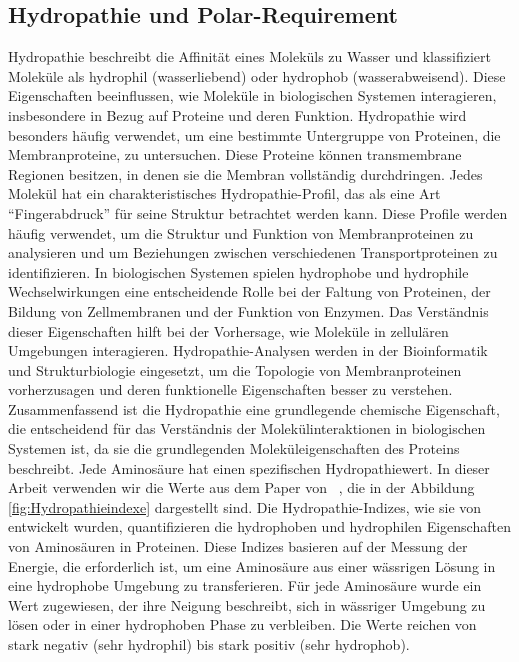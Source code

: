 \documentclass[german,version-2022-01]{uzl-thesis}
\begin{document}
\subsection{Hydropathie und Polar-Requirement}
Hydropathie beschreibt die Affinit\"at eines Molek\"uls zu Wasser und klassifiziert Molek\"ule als hydrophil (wasserliebend) oder hydrophob (wasserabweisend). Diese Eigenschaften beeinflussen, wie Molek\"ule in biologischen Systemen interagieren, insbesondere in Bezug auf Proteine und deren Funktion. Hydropathie wird besonders h\"aufig verwendet, um eine bestimmte Untergruppe von Proteinen, die Membranproteine, zu untersuchen. Diese Proteine k\"onnen transmembrane Regionen besitzen, in denen sie die Membran vollst\"andig durchdringen. Jedes Molek\"ul hat ein charakteristisches Hydropathie-Profil, das als eine Art "`Fingerabdruck"' f\"ur seine Struktur betrachtet werden kann. Diese Profile werden h\"aufig verwendet, um die Struktur und Funktion von Membranproteinen zu analysieren und um Beziehungen zwischen verschiedenen Transportproteinen zu identifizieren. In biologischen Systemen spielen hydrophobe und hydrophile Wechselwirkungen eine entscheidende Rolle bei der Faltung von Proteinen, der Bildung von Zellmembranen und der Funktion von Enzymen. Das Verst\"andnis dieser Eigenschaften hilft bei der Vorhersage, wie Molek\"ule in zellul\"aren Umgebungen interagieren. Hydropathie-Analysen werden in der Bioinformatik und Strukturbiologie eingesetzt, um die Topologie von Membranproteinen vorherzusagen und deren funktionelle Eigenschaften besser zu verstehen. Zusammenfassend ist die Hydropathie eine grundlegende chemische Eigenschaft, die entscheidend f\"ur das Verst\"andnis der Molek\"ulinteraktionen in biologischen Systemen ist, da sie die grundlegenden Molek\"uleigenschaften des Proteins beschreibt. Jede Aminos\"aure hat einen spezifischen Hydropathiewert. In dieser Arbeit verwenden wir die Werte aus dem Paper  von \citeauthor{kyte_simple_1982}~\cite{kyte_simple_1982}, die in der Abbildung \ref{fig:Hydropathieindexe} dargestellt sind. Die Hydropathie-Indizes, wie sie von \citeauthor{kyte_simple_1982} entwickelt wurden, quantifizieren die hydrophoben und hydrophilen Eigenschaften von Aminos\"auren in Proteinen. Diese Indizes basieren auf der Messung der Energie, die erforderlich ist, um eine Aminos\"aure aus einer w\"assrigen L\"osung in eine hydrophobe Umgebung zu transferieren. F\"ur jede Aminos\"aure wurde ein Wert zugewiesen, der ihre Neigung beschreibt, sich in w\"assriger Umgebung zu l\"osen oder in einer hydrophoben Phase zu verbleiben. Die Werte reichen von stark negativ (sehr hydrophil) bis stark positiv (sehr hydrophob).
\end{document}
